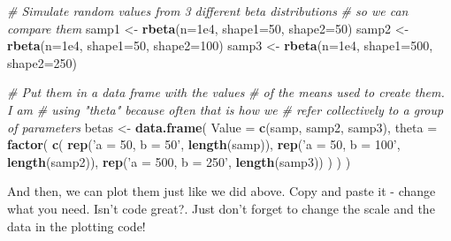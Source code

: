 \documentclass[
]{book}
\newenvironment{Shaded}{\begin{snugshade}}{\end{snugshade}}
\newcommand{\CommentTok}[1]{\textcolor[rgb]{0.56,0.35,0.01}{\textit{#1}}}
\newcommand{\DataTypeTok}[1]{\textcolor[rgb]{0.13,0.29,0.53}{#1}}
\newcommand{\DecValTok}[1]{\textcolor[rgb]{0.00,0.00,0.81}{#1}}
\newcommand{\FloatTok}[1]{\textcolor[rgb]{0.00,0.00,0.81}{#1}}
\newcommand{\KeywordTok}[1]{\textcolor[rgb]{0.13,0.29,0.53}{\textbf{#1}}}
\newcommand{\NormalTok}[1]{#1}
\newcommand{\StringTok}[1]{\textcolor[rgb]{0.31,0.60,0.02}{#1}}
\begin{document}
\begin{Shaded}
\begin{Highlighting}[]
\CommentTok{# Simulate random values from 3 different beta distributions}
\CommentTok{# so we can compare them}
\NormalTok{samp1 <-}\StringTok{ }\KeywordTok{rbeta}\NormalTok{(}\DataTypeTok{n=}\FloatTok{1e4}\NormalTok{, }\DataTypeTok{shape1=}\DecValTok{50}\NormalTok{, }\DataTypeTok{shape2=}\DecValTok{50}\NormalTok{)}
\NormalTok{samp2 <-}\StringTok{ }\KeywordTok{rbeta}\NormalTok{(}\DataTypeTok{n=}\FloatTok{1e4}\NormalTok{, }\DataTypeTok{shape1=}\DecValTok{50}\NormalTok{, }\DataTypeTok{shape2=}\DecValTok{100}\NormalTok{)     }
\NormalTok{samp3 <-}\StringTok{ }\KeywordTok{rbeta}\NormalTok{(}\DataTypeTok{n=}\FloatTok{1e4}\NormalTok{, }\DataTypeTok{shape1=}\DecValTok{500}\NormalTok{, }\DataTypeTok{shape2=}\DecValTok{250}\NormalTok{) }

\CommentTok{# Put them in a data frame with the values}
\CommentTok{# of the means used to create them. I am }
\CommentTok{# using "theta" because often that is how we}
\CommentTok{# refer collectively to a group of parameters}
\NormalTok{betas <-}\StringTok{ }\KeywordTok{data.frame}\NormalTok{(}
  \DataTypeTok{Value =} \KeywordTok{c}\NormalTok{(samp, samp2, samp3),}
  \DataTypeTok{theta =} \KeywordTok{factor}\NormalTok{(}
    \KeywordTok{c}\NormalTok{(}
      \KeywordTok{rep}\NormalTok{(}\StringTok{'a = 50, b = 50'}\NormalTok{, }\KeywordTok{length}\NormalTok{(samp)), }
      \KeywordTok{rep}\NormalTok{(}\StringTok{'a = 50, b = 100'}\NormalTok{, }\KeywordTok{length}\NormalTok{(samp2)), }
      \KeywordTok{rep}\NormalTok{(}\StringTok{'a = 500, b = 250'}\NormalTok{, }\KeywordTok{length}\NormalTok{(samp3))}
\NormalTok{    )}
\NormalTok{  )}
\NormalTok{)}
\end{Highlighting}
\end{Shaded}

And then, we can plot them just like we did above. Copy and paste it - change what you need. Isn't code great?. Just don't forget to change the scale and the data in the plotting code!
\end{document}
